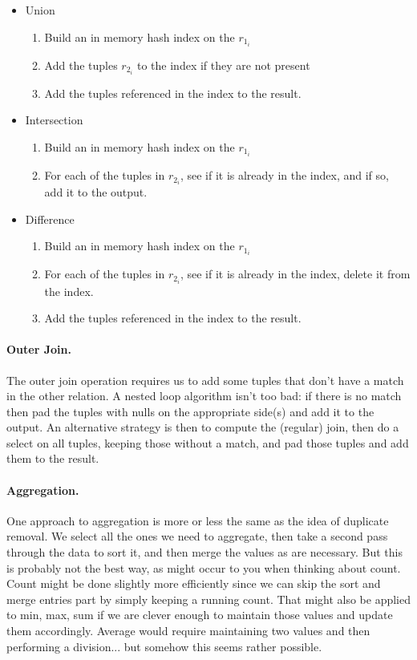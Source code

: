 \begin{itemize}
	\item Union
	\begin{enumerate}
		\item Build an in memory hash index on the $r_{1_{i}}$
		\item Add the tuples $r_{2_{i}}$ to the index if they are not present
		\item Add the tuples referenced in the index to the result.
	\end{enumerate}
	
	\item Intersection
	\begin{enumerate}
		\item Build an in memory hash index on the $r_{1_{i}}$
		\item For each of the tuples in $r_{2_{i}}$, see if it is already in the index, and if so, add it to the output.
	\end{enumerate}
	
	\item Difference
	\begin{enumerate}
		\item Build an in memory hash index on the $r_{1_{i}}$
		\item For each of the tuples in $r_{2_{i}}$, see if it is already in the index, delete it from the index.
		\item Add the tuples referenced in the index to the result.
	\end{enumerate}

\end{itemize}

\paragraph{Outer Join.}
The outer join operation requires us to add some tuples that don't have a match in the other relation. A nested loop algorithm isn't too bad: if there is no match then pad the tuples with nulls on the appropriate side(s) and add it to the output. An alternative strategy is then to compute the (regular) join, then do a select on all tuples, keeping those without a match, and pad those tuples and add them to the result.

\paragraph{Aggregation.} One approach to aggregation is more or less the same as the idea of duplicate removal. We select all the ones we need to aggregate, then take a second pass through the data to sort it, and then merge the values as are necessary. But this is probably not the best way, as might occur to you when thinking about count. Count might be done slightly more efficiently since we can skip the sort and merge entries part by simply keeping a running count. That might also be applied to min, max, sum if we are clever enough to maintain those values and update them accordingly. Average would require maintaining two values and then performing a division... but somehow this seems rather possible.

